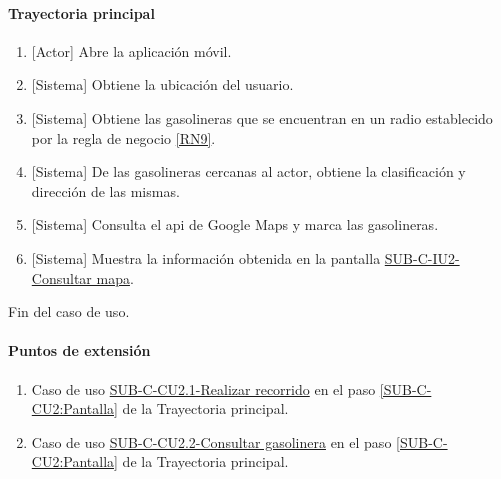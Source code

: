 \paragraph{Trayectoria principal}
	\begin{enumerate}
		\item {[Actor]} Abre la aplicación móvil.
		\item {[Sistema]} Obtiene la ubicación del usuario.
		\item {[Sistema]} Obtiene las gasolineras que se encuentran en un radio establecido por la regla de negocio \ref{RN9}.
		\item {[Sistema]} De las gasolineras cercanas al actor, obtiene la clasificación y dirección de las mismas.
		\item {[Sistema]} Consulta el api de Google Maps y marca las gasolineras.
		\item \label{SUB-C-CU2:Pantalla} {[Sistema]} Muestra la información obtenida en la pantalla \hyperref[fig:sub-c-iu2]{SUB-C-IU2-Consultar mapa}.
	\end{enumerate}
	Fin del caso de uso.

\paragraph{Puntos de extensión} \label{SUB-C-CU2:PE}
\begin{enumerate}[label=PE\arabic*.]
	\item Caso de uso \hyperref[SUB-C-CU2.1]{SUB-C-CU2.1-Realizar recorrido} en el paso \ref{SUB-C-CU2:Pantalla} de la Trayectoria principal.
	\item Caso de uso \hyperref[SUB-C-CU2.2]{SUB-C-CU2.2-Consultar gasolinera} en el paso \ref{SUB-C-CU2:Pantalla} de la Trayectoria principal.
\end{enumerate}
